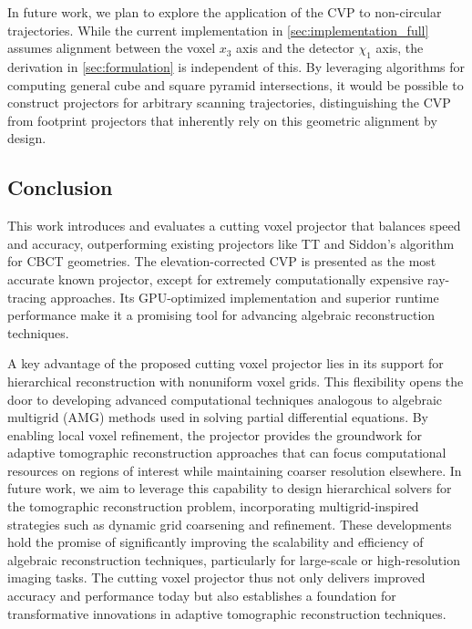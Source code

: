 In future work, we plan to explore the application of the CVP to non-circular trajectories. While the current implementation in \cref{sec:implementation_full} assumes alignment between the voxel $x_3$ axis and the detector $\chi_1$ axis, the derivation in \cref{sec:formulation} is independent of this. By leveraging algorithms for computing general cube and square pyramid intersections, it would be possible to construct projectors for arbitrary scanning trajectories, distinguishing the CVP from footprint projectors that inherently rely on this geometric alignment by design.

\subsection{Conclusion}
This work introduces and evaluates a cutting voxel projector that balances speed and accuracy, outperforming existing projectors like TT and Siddon's algorithm for CBCT geometries. The elevation-corrected CVP is presented as the most accurate known projector, except for extremely computationally expensive ray-tracing approaches. Its GPU-optimized implementation and superior runtime performance make it a promising tool for advancing algebraic reconstruction techniques.

A key advantage of the proposed cutting voxel projector lies in its support for hierarchical reconstruction with nonuniform voxel grids. This flexibility opens the door to developing advanced computational techniques analogous to algebraic multigrid (AMG) methods used in solving partial differential equations. By enabling local voxel refinement, the projector provides the groundwork for adaptive tomographic reconstruction approaches that can focus computational resources on regions of interest while maintaining coarser resolution elsewhere. In future work, we aim to leverage this capability to design hierarchical solvers for the tomographic reconstruction problem, incorporating multigrid-inspired strategies such as dynamic grid coarsening and refinement. These developments hold the promise of significantly improving the scalability and efficiency of algebraic reconstruction techniques, particularly for large-scale or high-resolution imaging tasks. The cutting voxel projector thus not only delivers improved accuracy and performance today but also establishes a foundation for transformative innovations in adaptive tomographic reconstruction techniques.